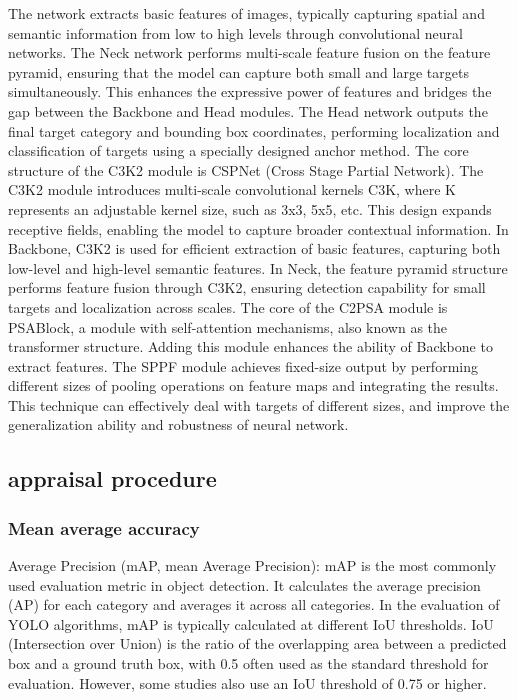 \documentclass[
]{article}
\begin{document}
The network extracts basic features of images, typically capturing
spatial and semantic information from low to high levels through
convolutional neural networks. The Neck network performs multi-scale
feature fusion on the feature pyramid, ensuring that the model can
capture both small and large targets simultaneously. This enhances the
expressive power of features and bridges the gap between the Backbone
and Head modules. The Head network outputs the final target category and
bounding box coordinates, performing localization and classification of
targets using a specially designed anchor method. The core structure of
the C3K2 module is CSPNet (Cross Stage Partial Network). The C3K2 module
introduces multi-scale convolutional kernels C3K, where K represents an
adjustable kernel size, such as 3x3, 5x5, etc. This design expands
receptive fields, enabling the model to capture broader contextual
information. In Backbone, C3K2 is used for efficient extraction of basic
features, capturing both low-level and high-level semantic features. In
Neck, the feature pyramid structure performs feature fusion through
C3K2, ensuring detection capability for small targets and localization
across scales. The core of the C2PSA module is PSABlock, a module with
self-attention mechanisms, also known as the transformer structure.
Adding this module enhances the ability of Backbone to extract features.
The SPPF module achieves fixed-size output by performing different sizes
of pooling operations on feature maps and integrating the results. This
technique can effectively deal with targets of different sizes, and
improve the generalization ability and robustness of neural network.

\subsection{appraisal procedure}\label{appraisal-procedure}

\subsubsection{Mean average accuracy}\label{mean-average-accuracy}

Average Precision (mAP, mean Average Precision): mAP is the most
commonly used evaluation metric in object detection. It calculates the
average precision (AP) for each category and averages it across all
categories. In the evaluation of YOLO algorithms, mAP is typically
calculated at different IoU thresholds. IoU (Intersection over Union) is
the ratio of the overlapping area between a predicted box and a ground
truth box, with 0.5 often used as the standard threshold for evaluation.
However, some studies also use an IoU threshold of 0.75 or higher.
\end{document}
